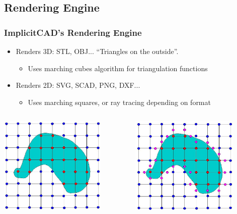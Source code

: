 \documentclass{beamer}
\begin{document}


\subsection{Rendering Engine}
\begin{frame}
\frametitle{ImplicitCAD's Rendering Engine}
\begin{itemize}
\item Renders 3D: STL, OBJ... ``Triangles on the outside''.
\begin{itemize}
\item Uses marching cubes algorithm for triangulation functions
\end{itemize}
\item Renders 2D: SVG, SCAD, PNG, DXF...
\begin{itemize}
\item Uses marching squares, or ray tracing depending on format
\end{itemize}
\end{itemize}
\begin{columns}
  \begin{column}{0.33\textwidth}
    \includegraphics[width=0.8\textwidth, right]{labeledobj.jpg}
  \end{column}
  \begin{column}{0.33\textwidth}
    \includegraphics[width=0.8\textwidth, center]{purpledobj.jpg}

\end{column}
\end{columns}
\end{frame}
\end{document}
